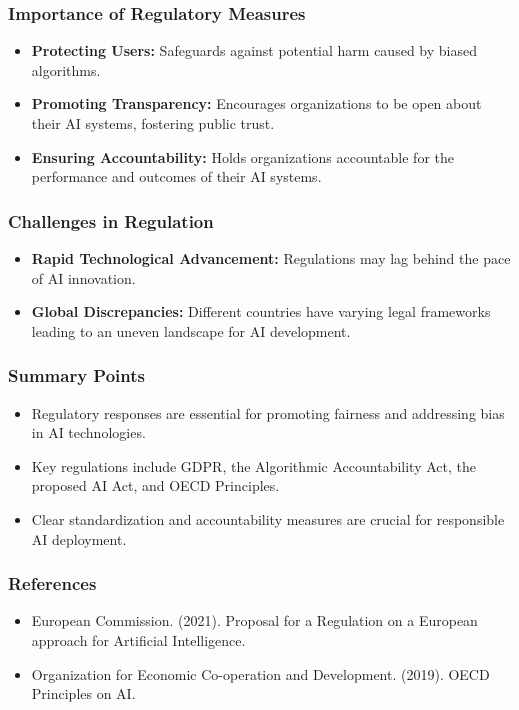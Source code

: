 \documentclass{beamer}
\begin{document}
\begin{frame}[fragile]
    \frametitle{Importance of Regulatory Measures}
    \begin{itemize}
        \item \textbf{Protecting Users:} Safeguards against potential harm caused by biased algorithms.
        \item \textbf{Promoting Transparency:} Encourages organizations to be open about their AI systems, fostering public trust.
        \item \textbf{Ensuring Accountability:} Holds organizations accountable for the performance and outcomes of their AI systems.
    \end{itemize}
\end{frame}

\begin{frame}[fragile]
    \frametitle{Challenges in Regulation}
    \begin{itemize}
        \item \textbf{Rapid Technological Advancement:} Regulations may lag behind the pace of AI innovation.
        \item \textbf{Global Discrepancies:} Different countries have varying legal frameworks leading to an uneven landscape for AI development.
    \end{itemize}
\end{frame}

\begin{frame}[fragile]
    \frametitle{Summary Points}
    \begin{itemize}
        \item Regulatory responses are essential for promoting fairness and addressing bias in AI technologies.
        \item Key regulations include GDPR, the Algorithmic Accountability Act, the proposed AI Act, and OECD Principles.
        \item Clear standardization and accountability measures are crucial for responsible AI deployment.
    \end{itemize}
\end{frame}

\begin{frame}[fragile]
    \frametitle{References}
    \begin{itemize}
        \item European Commission. (2021). Proposal for a Regulation on a European approach for Artificial Intelligence.
        \item Organization for Economic Co-operation and Development. (2019). OECD Principles on AI.
    \end{itemize}
\end{frame}
\end{document}
